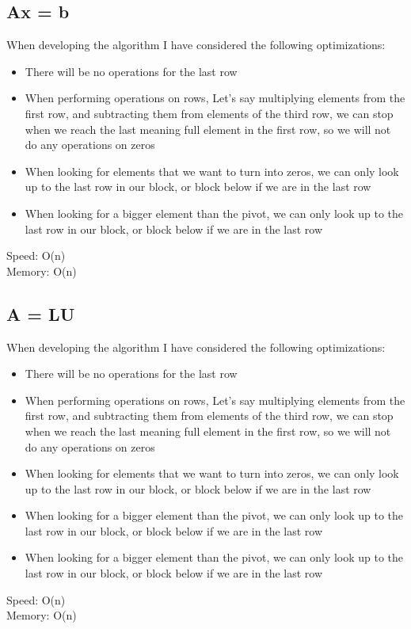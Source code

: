 \documentclass{article}
\begin{document}
\subsection*{Ax = b}
When developing the algorithm I have considered the following optimizations:
\begin{itemize}
    \item{There will be no operations for the last row}
    \item{When performing operations on rows, Let's say multiplying elements from the first row, and subtracting them from elements of the third row, we can stop when we reach the last meaning full element in the first row, so we will not do any operations on zeros}
    \item {When looking for elements that we want to turn into zeros, we can only look up to the last row in our block, or block below if we are in the last row}
    \item {When looking for a bigger element than the pivot, we can only look up to the last row in our block, or block below if we are in the last row}
\end{itemize}
Speed: O(n)\\
Memory: O(n)
\subsection*{A = LU}
When developing the algorithm I have considered the following optimizations:
\begin{itemize}
    \item{There will be no operations for the last row}
    \item{When performing operations on rows, Let's say multiplying elements from the first row, and subtracting them from elements of the third row, we can stop when we reach the last meaning full element in the first row, so we will not do any operations on zeros}
    \item {When looking for elements that we want to turn into zeros, we can only look up to the last row in our block, or block below if we are in the last row}
    \item {When looking for a bigger element than the pivot, we can only look up to the last row in our block, or block below if we are in the last row}
    \item {When looking for a bigger element than the pivot, we can only look up to the last row in our block, or block below if we are in the last row}
\end{itemize}
Speed: O(n)\\
Memory: O(n)
\end{document}
